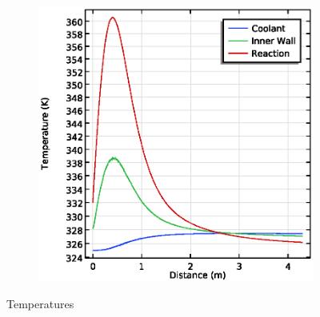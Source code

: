 \begin{figure}[h]
\begin{subfigure}{0.49\linewidth}
        \includegraphics[width=\linewidth, scale=0.5]{figures/temperature-lines.eps}
        \caption{}
        \label{fig:comsol-temperature:lines}
    \end{subfigure}

    \caption{Temperatures}
    \label{fig:comsol-temperature}
\end{figure}
